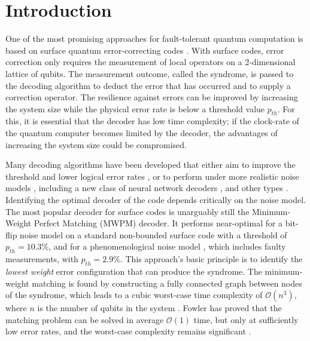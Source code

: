 \section{Introduction}\label{sec:introduction}
One of the most promising approaches for fault-tolerant quantum computation is based on surface quantum error-correcting codes \cite{dennis2002topological, kitaev2003fault}. With surface codes, error correction only requires the measurement of local operators on a 2-dimensional lattice of qubits. The measurement outcome, called the syndrome, is passed to the decoding algorithm to deduct the error that has occurred and to supply a correction operator. The resilience against errors can be improved by increasing the system size while the physical error rate is below a threshold value $p_{th}$. For this, it is essential that the decoder has low time complexity; if the clock-rate of the quantum computer becomes limited by the decoder, the advantages of increasing the system size could be compromised.

Many decoding algorithms have been developed that either aim to improve the threshold and lower logical error rates \cite{wang2003confinement, raussendorf2007faulttolerant, fowler2012towards, fowler2013minimum, heim2016optimal, duclos2010fast, duclos2013fault, bravyi2014efficient, darmawan2018linear}, or to perform under more realistic noise models \cite{tuckett2020fault, hutter2015improved, bravyi2013quantum,  nickerson2019analysing, wootton2012high, huang2020fault}, including a new class of neural network decoders \cite{baireuther2019neural, chamberland2018deep, liu2019neural, nautrup2019optimizing, torlai2017neural, varsamopoulos2017decoding, varsamopoulos2020decoding}, and other types \cite{bombin2012universal, herold2015cellular, horsman2012surface, kubica2019cellular, watson2015fast}. Identifying the optimal decoder of the code depends critically on the noise model. The most popular decoder for surface codes is unarguably still the Minimum-Weight Perfect Matching (MWPM) decoder. It performs near-optimal for a bit-flip noise model \cite{dennis2002topological} on a standard non-bounded surface code with a threshold of $p_{th} = 10.3\%$, and for a phenomenological noise model \cite{wang2003confinement}, which includes faulty measurements, with $p_{th} = 2.9\%$. This approach's basic principle is to identify the \emph{lowest weight} error configuration that can produce the syndrome. The minimum-weight matching is found by constructing a fully connected graph between nodes of the syndrome, which leads to a cubic worst-case time complexity of $\mathcal{O}(n^3)$, where $n$ is the number of qubits in the system \cite{kolmogorov2009blossom}. Fowler has proved that the matching problem can be solved in average $\mathcal{O}(1)$ time, but only at sufficiently low error rates, and the worst-case complexity remains significant \cite{fowler2013minimum}. 

